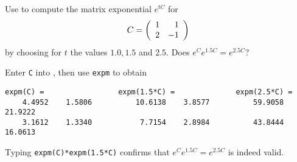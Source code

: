 \documentclass{ximera}
\begin{document}
\begin{computerExercise} \label{c6.2.2}
Use \Matlab to compute the matrix exponential $e^{tC}$ for
\[
     C =\left(\begin{array}{rr} 1 & 1\\ 2 &-1\end{array}\right)
\]
by choosing for $t$ the values $1.0,1.5$ and $2.5$.  Does $e^{C}
e^{1.5C}=e^{2.5C}$?

\begin{solution}

Enter {\tt C} into \Matlab, then use {\tt expm} to obtain
\begin{verbatim}
expm(C) =                 expm(1.5*C) =              expm(2.5*C) =
    4.4952    1.5806          10.6138    3.8577          59.9058   21.9222
    3.1612    1.3340           7.7154    2.8984          43.8444   16.0613
\end{verbatim}
Typing {\tt expm(C)*expm(1.5*C)} confirms that $e^Ce^{1.5C} =
e^{2.5C}$ is indeed valid.

\end{solution}
\end{computerExercise}
\end{document}
